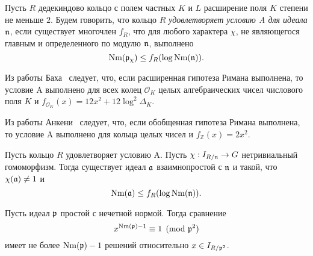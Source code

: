 \documentclass[_00_autoref.tex]{subfiles}
\begin{document}
\begin{definition}
    Пусть $R$ дедекиндово кольцо с полем частных $K$ и $L$ расширение поля $K$ степени не меньше $2$.
    Будем говорить, что кольцо $R$ \emph{удовлетворяет условию A для идеала $\mathfrak{n}$}, если существует многочлен $f_R$, что для любого характера $\chi$, не являющегося главным и определенного по модулю $\mathfrak{n}$, выполнено
    \begin{equation*}
        \textrm{Nm}(\mathfrak{p}_{\chi}) \le f_R(\log{\textrm{Nm}(\mathfrak{n})}).
    \end{equation*}
\end{definition}

\begin{remark}
    Из работы Баха~\cite{source:Bach} следует, что, если расширенная гипотеза Римана выполнена, то условие A выполнено для всех колец $\mathcal{O}_K$ целых алгебраических чисел числового поля $K$ и $f_{\mathcal{O}_K}(x) = 12x^2 + 12\log^2 \Delta_{K}$.
\end{remark}

\begin{remark}
    Из работы Анкени~\cite{source:Ankeny} следует, что, если обобщенная гипотеза Римана выполнена, то условие A выполнено для кольца целых чисел и $f_{\mathbb{Z}}(x) = 2x^2$.
\end{remark}

\begin{proposition}\label{proposition:condition_A_with_any_homomorphism}
    Пусть кольцо $R$ удовлетворяет условию A.
    Пусть $\chi: I_{R/\mathfrak{n}} \to G$ нетривиальный гомоморфизм.
    Тогда существует идеал $\mathfrak{a}$ взаимнопростой с $\mathfrak{n}$ и такой, что $\chi(\mathfrak{a}) \neq 1$ и
    \begin{equation*}
        \textrm{Nm}(\mathfrak{a}) \le f_R(\log{\textrm{Nm}(\mathfrak{n})}).
    \end{equation*}
\end{proposition}

\begin{proposition}\label{proposition:miller_criteria_character}
    Пусть идеал $\mathfrak{p}$ простой с нечетной нормой.
    Тогда сравнение
    \begin{equation*}
        x^{\textrm{Nm}(\mathfrak{p}) - 1} \equiv 1 \pmod{\mathfrak{p}^2}
    \end{equation*}
    имеет не более $\textrm{Nm}(\mathfrak{p}) - 1$ решений относительно $x \in I_{R/\mathfrak{p}^2}$.
\end{proposition}
\end{document}
